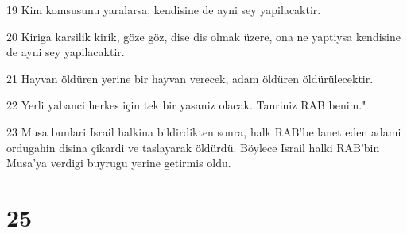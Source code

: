 \par 19 Kim komsusunu yaralarsa, kendisine de ayni sey yapilacaktir.
\par 20 Kiriga karsilik kirik, göze göz, dise dis olmak üzere, ona ne yaptiysa kendisine de ayni sey yapilacaktir.
\par 21 Hayvan öldüren yerine bir hayvan verecek, adam öldüren öldürülecektir.
\par 22 Yerli yabanci herkes için tek bir yasaniz olacak. Tanriniz RAB benim."
\par 23 Musa bunlari Israil halkina bildirdikten sonra, halk RAB'be lanet eden adami ordugahin disina çikardi ve taslayarak öldürdü. Böylece Israil halki RAB'bin Musa'ya verdigi buyrugu yerine getirmis oldu.

\chapter{25}


